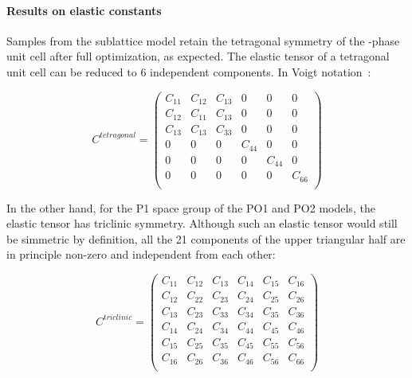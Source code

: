 \documentclass[superscriptaddress, 12pt]{revtex4-2}%
\begin{document}
\paragraph{Results on elastic constants}



Samples from the sublattice model retain the tetragonal symmetry of the \textsigma-phase unit cell after full optimization, as expected. 
The elastic tensor of a tetragonal unit cell can be reduced to 6 independent components.
In Voigt notation~\cite{golesorkhtabar_elastic_2013}:

\begin{equation}\label{eqn:tetragonalElasticTensor}
  C^{tetragonal} =
  \begin{pmatrix}
    C_{11} & C_{12} & C_{13} & 0 & 0 & 0 \\
    C_{12} & C_{11} & C_{13} & 0 & 0 & 0 \\
    C_{13} & C_{13} & C_{33} & 0 & 0 & 0 \\
    0 & 0 & 0 & C_{44} & 0 & 0 \\
    0 & 0 & 0 & 0 & C_{44} & 0 \\
    0 & 0 & 0 & 0 & 0 & C_{66} \\
  \end{pmatrix}
\end{equation}

In the other hand, for the P1 space group of the PO1 and PO2 models, the elastic tensor has triclinic symmetry. 
Although such an elastic tensor would still be simmetric by definition, all the 21 components of the upper triangular half are in principle non-zero and independent from each other:

\begin{equation}\label{eqn:triclinicElasticTensor}
  C^{triclinic} =
  \begin{pmatrix}
    C_{11} & C_{12} & C_{13} & C_{14} & C_{15} & C_{16} \\
    C_{12} & C_{22} & C_{23} & C_{24} & C_{25} & C_{26} \\
    C_{13} & C_{23} & C_{33} & C_{34} & C_{35} & C_{36} \\
    C_{14} & C_{24} & C_{34} & C_{44} & C_{45} & C_{46} \\
    C_{15} & C_{25} & C_{35} & C_{45} & C_{55} & C_{56} \\
    C_{16} & C_{26} & C_{36} & C_{46} & C_{56} & C_{66} \\
  \end{pmatrix}
\end{equation}
\end{document}
